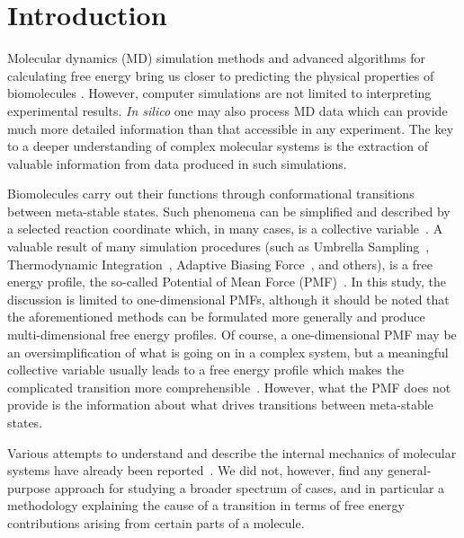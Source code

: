 \documentclass[a4paper,11pt,twoside]{book}%
\begin{document}
\section{Introduction}

Molecular dynamics (MD) simulation methods and advanced algorithms for calculating free energy bring us closer to predicting the physical properties of biomolecules \cite{woo2005calculation,chipot2014frontiers,comer2014adaptive}.
However, computer simulations are not limited to interpreting experimental results.
\emph{In silico} one may also process MD data which can provide much more detailed information than that accessible in any experiment.
The key to a deeper understanding of complex molecular systems is the extraction of valuable information from data produced in such simulations.

Biomolecules carry out their functions through conformational transitions between meta-stable states.
Such phenomena can be simplified and described by a selected reaction coordinate which, in many cases, is a collective variable~\cite{chipot2007free}.
A valuable result of many simulation procedures (such as Umbrella Sampling~\cite{torrie1977nonphysical}, Thermodynamic Integration~\cite{kirkwood1935statistical}, Adaptive Biasing Force~\cite{comer2014adaptive}, and others\cite{gumbart2012standard}), is a free energy profile, the so-called Potential of Mean Force (PMF)~\cite{kirkwood1935statistical}.
{\color{black}In this study, the discussion is limited to one-dimensional PMFs, although it should be noted that the aforementioned methods can be formulated more generally and produce multi-dimensional free energy profiles.}
Of course, a one-dimensional PMF may be an oversimplification of what is going on in a complex system, but a meaningful collective variable usually leads to a free energy profile which makes the complicated transition more comprehensible~\cite{periole2012structural,chipot2014frontiers}.
However, what the PMF does not provide is the information about what drives transitions between meta-stable states.

Various attempts to understand and describe the internal mechanics of {\color{black}molecular systems} have already been reported~\cite{arnautova2011development,bao2009protein,chiang2013molecular,lavery2007protein,sacquin2014motions,van1997engineering,seifert2013protein}.
We did not, however, find any general-purpose approach for studying a broader spectrum of cases, and in particular a methodology explaining the cause of a transition in terms of free energy contributions arising from certain parts of a molecule.
\end{document}
